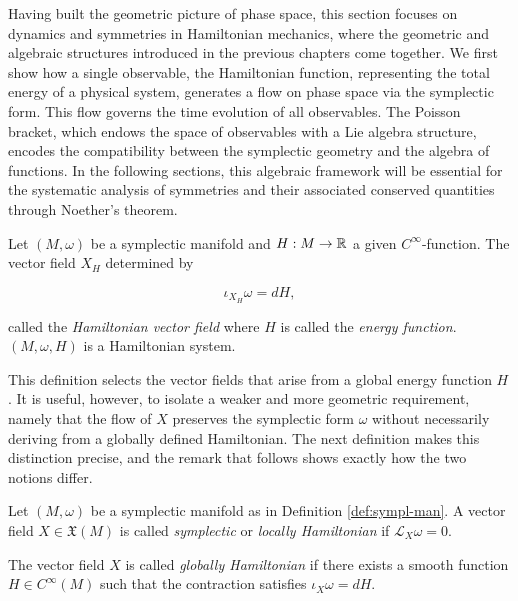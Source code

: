 Having built the geometric picture of phase space, this section focuses on dynamics and symmetries in Hamiltonian mechanics, where the geometric and algebraic structures introduced in the previous chapters come together. We first show how a single observable, the Hamiltonian function, representing the total energy of a physical system, generates a flow on phase space via the symplectic form. This flow governs the time evolution of all observables. The Poisson bracket, which endows the space of observables with a Lie algebra structure, encodes the compatibility between the symplectic geometry and the algebra of functions. In the following sections, this algebraic framework will be essential for the systematic analysis of symmetries and their associated conserved quantities through Noether's theorem.

\begin{definition}\label{def:ham-field}
	Let $(M, \omega)$ be a symplectic manifold and $H : M \to \mathbb{R}$ a given $C^\infty$-function. The vector field $X_H$ determined by 
	
	\begin{equation}
		\iota_{X_H}\omega=dH, \label{eq:hamiltonian}
	\end{equation}
	
	\noindent called the \emph{Hamiltonian vector field} where $H$ is called the \emph{energy function}. $(M, \omega, H)$ is a Hamiltonian system.
\end{definition}

This definition selects the vector fields that arise from a global energy function $H$. It is useful, however, to isolate a weaker and more geometric requirement, namely that the flow of $X$ preserves the symplectic form $\omega$ without necessarily deriving from a globally defined Hamiltonian. The next definition makes this distinction precise, and the remark that follows shows exactly how the two notions differ.

\begin{definition}\label{def:symp-ham-fields}
	Let $(M,\omega)$ be a symplectic manifold as in Definition \ref{def:sympl-man}. A vector field $X \in \mathfrak{X}(M)$ is called \emph{symplectic} or \emph{locally Hamiltonian} if $\mathscr{L}_X\omega = 0$. 
	
	The vector field $X$ is called \emph{globally Hamiltonian} if there exists a smooth function $H \in C^\infty(M)$ such that the contraction satisfies $\iota_X\omega = dH$.
\end{definition}


